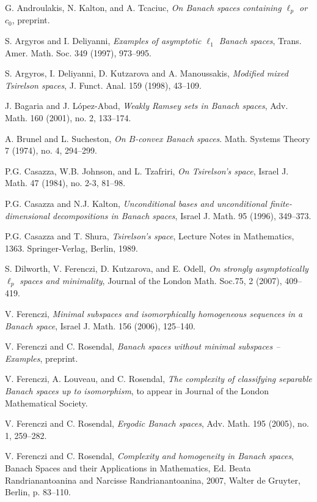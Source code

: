 \documentclass[10pt]{amsart}
\numberwithin{equation}{section}
\begin{document}
\begin{thebibliography}{999}

 G. Androulakis, N. Kalton, and A. Tcaciuc, {\em On Banach spaces containing $\ell_p$ or $c_0$},
preprint.

 S. Argyros and I. Deliyanni, {\em Examples of asymptotic $\ell_1$
Banach spaces}, Trans. Amer. Math. Soc. 349 (1997), 973--995.

 S. Argyros, I. Deliyanni, D. Kutzarova and A. Manoussakis, {\em
Modified mixed Tsirelson spaces}, J. Funct. Anal. 159 (1998), 43--109.

 J. Bagaria and J. L\'opez-Abad,
{\em Weakly Ramsey sets in Banach spaces},  Adv. Math.  160  (2001),  no. 2, 133--174.

A. Brunel and L. Sucheston, {\em
On $B$-convex Banach spaces}. Math. Systems Theory 7 (1974), no. 4, 294--299.

P.G. Casazza, W.B. Johnson, and L. Tzafriri, {\em  On Tsirelson's space},
Israel J. Math.  47  (1984),  no. 2-3, 81--98.

 P.G. Casazza and N.J. Kalton, {\em Unconditional bases and
    unconditional finite-dimensional decompositions in Banach spaces}, Israel
    J. Math. 95 (1996), 349--373.

 P.G. Casazza and T. Shura, {\em Tsirelson's space}, Lecture Notes
  in Mathematics, 1363. Springer-Verlag, Berlin, 1989.

 S. Dilworth, V. Ferenczi, D. Kutzarova, and E. Odell,
{\em On strongly asymptotically $\ell_p$ spaces and minimality}, Journal of the London Math. Soc.75, 2 (2007), 409--419.

V. Ferenczi, {\em Minimal subspaces and isomorphically homogeneous sequences in
a Banach space}, Israel J. Math.  156 (2006), 125--140.

 V. Ferenczi and C. Rosendal, {\em Banach spaces without minimal subspaces --
Examples}, preprint.

V. Ferenczi, A. Louveau, and C. Rosendal,
{\em The complexity of classifying separable Banach spaces up to isomorphism},
to appear in Journal of the London Mathematical Society.

 V. Ferenczi and C. Rosendal, {\em Ergodic Banach spaces},
Adv. Math. 195 (2005), no. 1, 259--282.

V. Ferenczi and C. Rosendal,  {\em Complexity and homogeneity in Banach
    spaces}, Banach Spaces and their Applications in Mathematics, Ed. Beata Randrianantoanina
    and Narcisse Randrianantoanina, 2007, Walter de Gruyter, Berlin, p. 83--110.


\end{thebibliography}
\end{document}
